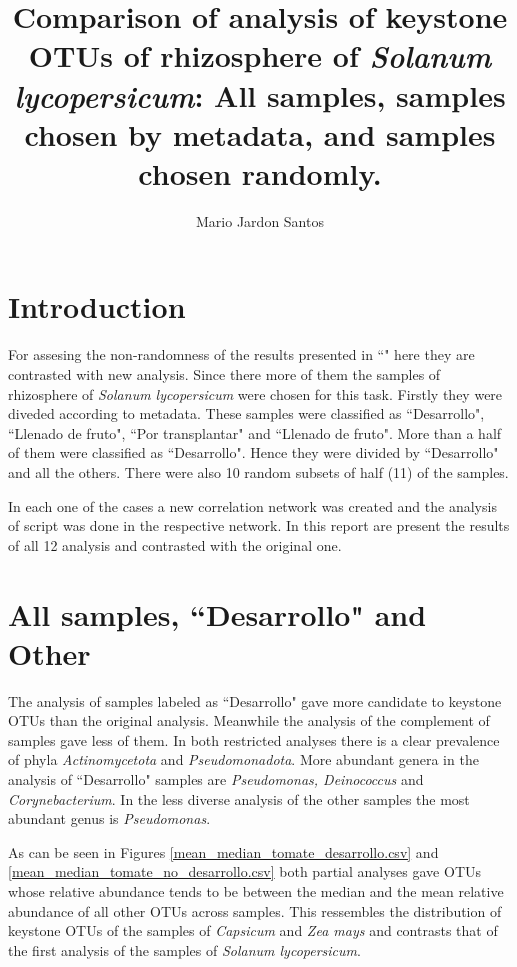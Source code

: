 \documentclass{article}
\title{Comparison of analysis of keystone OTUs of rhizosphere of \textit{Solanum lycopersicum}: All samples, samples chosen by metadata, and samples chosen randomly.}
\author{Mario Jardon Santos}
\date{}
\begin{document}
\maketitle

\section{Introduction}
\label{intro}



For assesing the non-randomness of the results presented in ``" here they are contrasted with new analysis. 
Since there more of them the samples of rhizosphere of \textit{Solanum lycopersicum} were chosen for this task.
Firstly they were diveded according to metadata. 
These samples were classified as ``Desarrollo", ``Llenado de fruto", ``Por transplantar" and ``Llenado de fruto".
More than a half of them were classified as ``Desarrollo".
Hence they were divided by ``Desarrollo" and all the others.
There were also 10 random subsets of half (11) of the samples.

In each one of the cases a new correlation network was created and the analysis of script was done in the respective network. 
In this report are present the results of all 12 analysis and contrasted with the original one.

\section{All samples, ``Desarrollo" and Other}
\label{des_vs_no_des}

The analysis of samples labeled as ``Desarrollo" gave more candidate to keystone OTUs  than the original analysis.
Meanwhile the analysis of the complement of samples gave less of them.
In both restricted analyses there is a clear prevalence of phyla \textit{Actinomycetota} and \textit{Pseudomonadota}. 
More abundant genera in the analysis of ``Desarrollo" samples are \textit{Pseudomonas, Deinococcus} and \textit{Corynebacterium}. 
In the less diverse analysis of the other samples the most abundant genus is \textit{Pseudomonas}. 

As can be seen in Figures \ref{mean_median_tomate_desarrollo.csv} and  \ref{mean_median_tomate_no_desarrollo.csv} both partial analyses gave OTUs whose relative abundance tends to be between the median and the mean relative abundance of all other OTUs across samples.
This ressembles the distribution of keystone OTUs of the samples of \textit{Capsicum} and \textit{Zea mays} and contrasts that of the first analysis of the samples of \textit{Solanum lycopersicum}.
\end{document}
